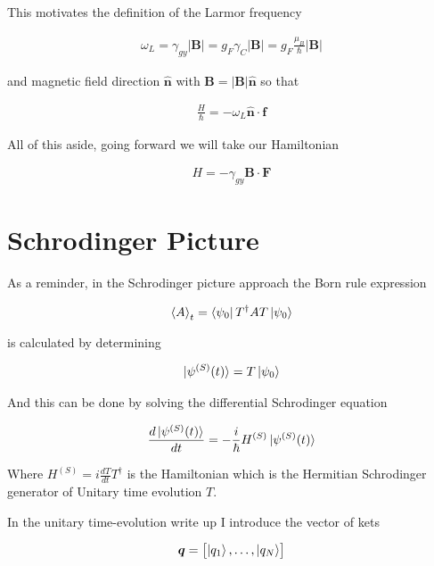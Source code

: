 \documentclass[12pt]{article}
\newcommand{\bv}[1]{\boldsymbol{#1}}
\begin{document}
This motivates the definition of the Larmor frequency

\begin{align}
\omega_L = \gamma_{gy}|\bv{B}| = g_F \gamma_C |\bv{B}| = g_F \frac{\mu_B}{\hbar}|\bv{B}|
\end{align}

and magnetic field direction $\bv{\hat{n}}$ with $\bv{B} = |\bv{B}|\bv{\hat{n}}$ so that

\begin{align}
\frac{H}{\hbar} = -\omega_L \bv{\hat{n}}\cdot \bv{f}
\end{align}

All of this aside, going forward we will take our Hamiltonian

\begin{align}
H = -\gamma_{gy} \bv{B} \cdot \bv{F}
\end{align}

\section{Schrodinger Picture}

As a reminder, in the Schrodinger picture approach the Born rule expression

\begin{align}
\Braket{A}_t = \bra{\psi_0}T^{\dag}AT\ket{\psi_0}
\end{align}

is calculated by determining 

\begin{align}
\ket{\psi^{(S)}(t)} = T\ket{\psi_0}
\end{align}

And this can be done by solving the differential Schrodinger equation

\begin{align}
\frac{d\ket{\psi^{(S)}(t)}}{dt} = -\frac{i}{\hbar}H^{(S)}\ket{\psi^{(S)}(t)}
\end{align}

Where $H^{(S)} = i\frac{dT}{dt} T^{\dag}$ is the Hamiltonian which is the Hermitian Schrodinger generator of Unitary time evolution $T$.

In the unitary time-evolution write up I introduce the vector of kets

\begin{align}
\bv{q} = \begin{bmatrix}\ket{q_1}, \ldots,  \ket{q_N}\end{bmatrix}
\end{align}
\end{document}
